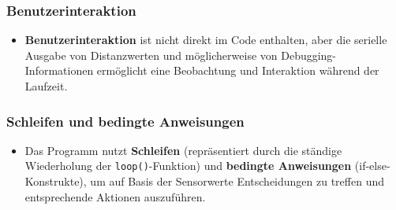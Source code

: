 \documentclass{vorlage-design-main}
\begin{document}
\hypertarget{benutzerinteraktion}{%
\subsubsection{Benutzerinteraktion}\label{benutzerinteraktion}}

\begin{itemize}

\item
  \textbf{Benutzerinteraktion} ist nicht direkt im Code enthalten, aber
  die serielle Ausgabe von Distanzwerten und möglicherweise von
  Debugging-Informationen ermöglicht eine Beobachtung und Interaktion
  während der Laufzeit.
\end{itemize}

\hypertarget{schleifen-und-bedingte-anweisungen}{%
\subsubsection{Schleifen und bedingte
Anweisungen}\label{schleifen-und-bedingte-anweisungen}}

\begin{itemize}

\item
  Das Programm nutzt \textbf{Schleifen} (repräsentiert durch die
  ständige Wiederholung der \verb|loop()|-Funktion)
  und \textbf{bedingte Anweisungen} (if-else-Konstrukte), um auf Basis
  der Sensorwerte Entscheidungen zu treffen und entsprechende Aktionen
  auszuführen.
\end{itemize}

\newpage
\end{document}

